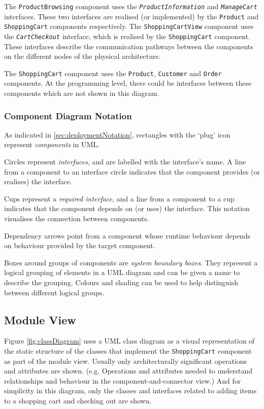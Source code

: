 The \texttt{ProductBrowsing} component uses the \texttt{\textsl{ProductInformation}} and \texttt{\textsl{ManageCart}} interfaces.
These two interfaces are realised (or implemented) by the \texttt{Product} and \texttt{ShoppingCart} components respectively.
The \texttt{ShoppingCartView} component uses the \texttt{\textsl{CartCheckout}} interface, which is realised by the \texttt{ShoppingCart} component.
These interfaces describe the communication pathways between the components on the different nodes of the physical architecture.

\noindent
The \texttt{ShoppingCart} component uses the \texttt{Product}, \texttt{Customer} and \texttt{Order} components.
At the programming level, there could be interfaces between these components which are not shown in this diagram.

\subsubsection{Component Diagram Notation}\label{sec:componentNotation}
As indicated in \ref{sec:deploymentNotation}, rectangles with the `plug' icon represent \emph{components} in UML.

Circles represent \emph{interfaces}, and are labelled with the interface's name.
A line from a component to an interface circle indicates that the component provides (or realises) the interface.

Cups represent a \emph{required interface}, and a line from a component to a cup indicates that the component depends on (or uses) the interface.
This notation visualises the connection between components.

Dependency arrows point from a component whose runtime behaviour depends on behaviour provided by the target component.

Boxes around groups of components are \emph{system boundary boxes}.
They represent a logical grouping of elements in a UML diagram and can be given a name to describe the grouping.
Colours and shading can be used to help distinguish between different logical groups.

\subsection{Module View}\label{sec_moduleView}
Figure \ref{fig:classDiagram} uses a UML class diagram as a visual representation of the static structure
of the classes that implement the \texttt{ShoppingCart} component as part of the module view.
Usually only architecturally significant operations and attributes are shown.
(e.g. Operations and attributes needed to understand relationships and behaviour in the component-and-connector view.)
And for simplicity in this diagram, only the classes and interfaces related to adding items to a shopping cart and checking out are shown.

